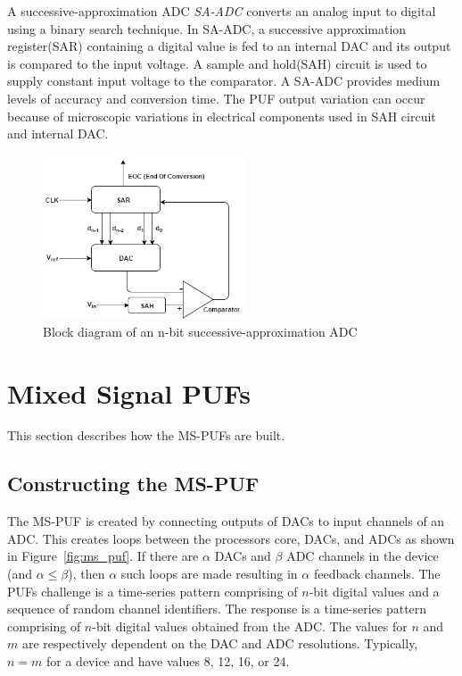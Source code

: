 A successive-approximation ADC {\em SA-ADC} converts an analog
input to digital using a binary search technique.
In SA-ADC, a successive approximation register(SAR) containing 
a digital value is fed to an internal DAC and its output is 
compared to the input voltage. A sample and hold(SAH) circuit 
is used to supply constant input voltage to the comparator. 
A SA-ADC provides medium levels of accuracy and conversion time. 
The PUF output variation can occur because of microscopic variations 
in electrical components used in SAH circuit and internal DAC.
\begin{figure}[h]
\includegraphics[width=6cm]{SA-ADC.png}
\centering
\caption{Block diagram of an n-bit successive-approximation ADC}
\end{figure}


\section{Mixed Signal PUFs}
This section describes how the MS-PUFs are built.

\subsection{Constructing the MS-PUF}
The MS-PUF is created by connecting outputs of DACs to 
input channels of an ADC. This creates loops between the processors
core, DACs, and ADCs as shown in Figure~\ref{fig:ms_puf}.
If there are $\alpha$ DACs and $\beta$ ADC channels in the device
(and $\alpha \le \beta$), then $\alpha$ such loops are made resulting 
in $\alpha$ feedback channels.
The PUFs challenge is a time-series pattern comprising of
$n$-bit digital values and a sequence of random channel identifiers.
The response is a time-series pattern comprising of $n$-bit digital 
values obtained from the ADC. The values for $n$ and $m$ are
respectively dependent on the DAC and ADC resolutions. Typically, $n = m$
for a device and have values 8, 12, 16, or 24.

